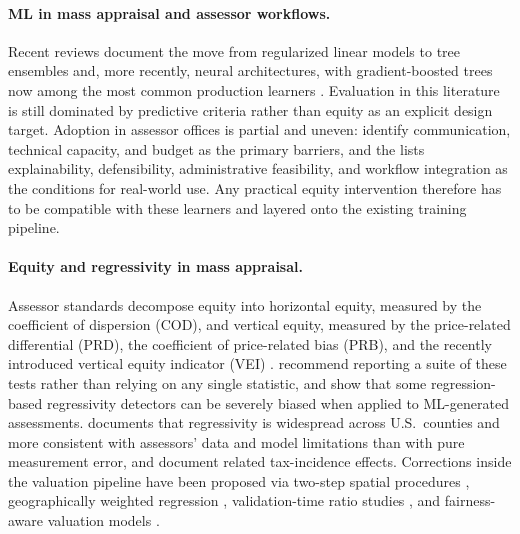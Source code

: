 \documentclass{article}
\theoremstyle{plain}
\theoremstyle{definition}
\newcommand{\1}{\mathbf{1}}
\begin{document}
\paragraph{ML in mass appraisal and assessor workflows.}
Recent reviews document the move from regularized linear models to tree ensembles and, more recently, neural architectures, with gradient-boosted trees now among the most common production learners \cite{WangLi2019,Rootetal2023,Sevgen2024100111,Zilli2024,purdueAssessingTechniques}. Evaluation in this literature is still dominated by predictive criteria rather than equity as an explicit design target. Adoption in assessor offices is partial and uneven: \textcite{BidansetRakow2022} identify communication, technical capacity, and budget as the primary barriers, and the \textcite{IAAOAITaskForce2022} lists explainability, defensibility, administrative feasibility, and workflow integration as the conditions for real-world use. Any practical equity intervention therefore has to be compatible with these learners and layered onto the existing training pipeline.

\paragraph{Equity and regressivity in mass appraisal.}
Assessor standards decompose equity into horizontal equity, measured by the coefficient of dispersion (COD), and vertical equity, measured by the price-related differential (PRD), the coefficient of price-related bias (PRB), and the recently introduced vertical equity indicator (VEI) \cite{IAAO2013Ratio,IAAO2025Mass,IAAO2025ExposureRatio,10578d49-78f8-3ef9-8277-9b6add2bd071,cornia2006property,McMillenSingh2023}. \textcite{IAAO2023VerticalReview} recommend reporting a suite of these tests rather than relying on any single statistic, and \textcite{McMillenSingh2023} show that some regression-based regressivity detectors can be severely biased when applied to ML-generated assessments. \textcite{Berry2021} documents that regressivity is widespread across U.S.\ counties and more consistent with assessors' data and model limitations than with pure measurement error, and \textcite{AvenancioLeonHoward2022} document related tax-incidence effects. Corrections inside the valuation pipeline have been proposed via two-step spatial procedures \cite{Quintos2014}, geographically weighted regression \cite{BidansetEtAl2019,BidansetEtAl2025}, validation-time ratio studies \cite{HermansEtAl2022,HermansEtAl2025}, and fairness-aware valuation models \cite{CandoganHanLu2023}.
\end{document}
